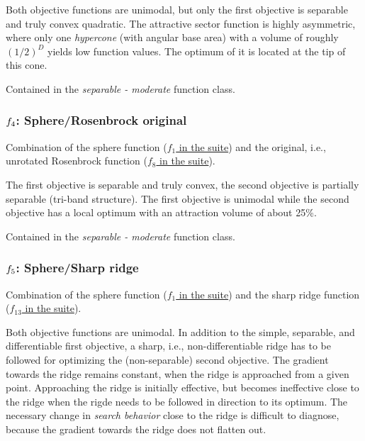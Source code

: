 \documentclass[letterpaper,12pt,english]{article}
\begin{document}
Both objective functions are unimodal, but only the first objective is
separable and truly convex quadratic. The attractive sector
function is highly asymmetric, where only one \emph{hypercone} (with
angular base area) with a volume of roughly \((1/2)^D\)
yields low function values. The optimum of it is located at the tip
of this cone.

Contained in the \emph{separable - moderate} function class.


\subsubsection{\protect\(f_4\protect\): Sphere/Rosenbrock original}
\label{index:sphere-rosenbrock-original}\label{index:f4}
Combination of the sphere function (\href{http://coco.lri.fr/downloads/download15.03/bbobdocfunctions.pdf\#page=5}{\(f_1\) in the  suite})
and the original, i.e., unrotated Rosenbrock function (\href{http://coco.lri.fr/downloads/download15.03/bbobdocfunctions.pdf\#page=40}{\(f_8\) in the  suite}).

The first objective is separable and truly convex, the second
objective is partially separable (tri-band structure). The first
objective is unimodal while the second objective has a local
optimum with an attraction volume of about 25\%.

Contained in the \emph{separable - moderate} function class.


\subsubsection{\protect\(f_5\protect\): Sphere/Sharp ridge}
\label{index:sphere-sharp-ridge}\label{index:f5}
Combination of the sphere function (\href{http://coco.lri.fr/downloads/download15.03/bbobdocfunctions.pdf\#page=5}{\(f_1\) in the  suite})
and the sharp ridge function (\href{http://coco.lri.fr/downloads/download15.03/bbobdocfunctions.pdf\#page=65}{\(f_{13}\) in the  suite}).

Both objective functions are unimodal.
In addition to the simple, separable, and differentiable first
objective, a sharp, i.e., non-differentiable ridge has to be
followed for optimizing the (non-separable) second objective. The
gradient towards the ridge remains constant, when the ridge is
approached from a given point.
Approaching the ridge is initially effective, but becomes ineffective
close to the ridge when the rigde needs to be followed in direction
to its optimum.  The necessary change in \emph{search behavior} close to
the ridge is difficult to diagnose, because the gradient
towards the ridge does not flatten out.
\end{document}
